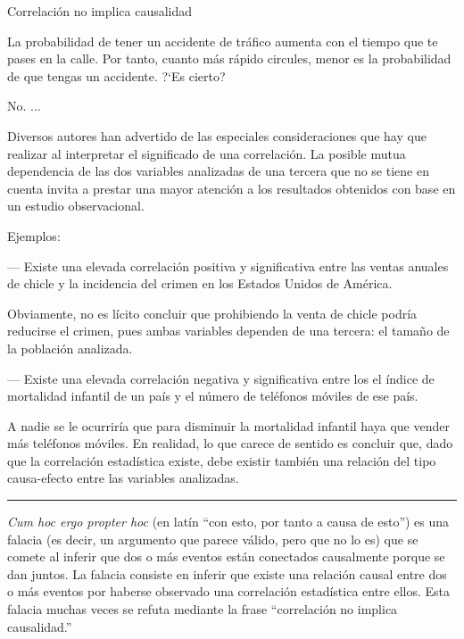 \begin{myexampleblock}{Correlación no implica causalidad}
\begin{small}
\vspace{2mm} La probabilidad de tener un accidente de tráfico aumenta con el tiempo que te pases en la calle. Por tanto, cuanto más rápido circules, menor es la probabilidad de que tengas un accidente. ?`Es cierto? 

\vspace{2mm} \textcolor{gris}{No. ... }

\vspace{2mm} Diversos autores han advertido de las especiales consideraciones que hay que realizar al interpretar el significado de una correlación. La posible mutua dependencia de las dos variables analizadas de una tercera que no se tiene en cuenta invita a prestar una mayor atención a los resultados obtenidos con base en un estudio observacional. 

\vspace{2mm} Ejemplos: 

\vspace{2mm} --- Existe una elevada correlación positiva y significativa entre las ventas anuales de chicle y la incidencia del crimen en los Estados Unidos de América. 

\vspace{2mm} Obviamente, no es lícito concluir que prohibiendo la venta de chicle podría reducirse el crimen, pues ambas variables dependen de una tercera: el tamaño de la población analizada. 

\vspace{2mm} --- Existe una elevada correlación negativa y significativa entre los el índice de mortalidad infantil de un país y el número de teléfonos móviles de ese país. 

\vspace{2mm} A nadie se le ocurriría que para disminuir la mortalidad infantil haya que vender más teléfonos móviles. En realidad, lo que carece de sentido es concluir que, dado que la correlación estadística existe, debe existir también una relación del tipo causa-efecto entre las variables analizadas. 


\rule{100pt}{0.1mm}

\vspace{2mm} 
\begin{adjustwidth}{20pt}{20pt}
	\textsf{\emph{Cum hoc ergo propter hoc} (en latín ``con esto, por tanto a causa de esto'') es una falacia (es decir, un argumento que parece válido, pero que no lo es) que se comete al inferir que dos o más eventos están conectados causalmente porque se dan juntos. La falacia consiste en inferir que existe una relación causal entre dos o más eventos por haberse observado una correlación estadística entre ellos. Esta falacia muchas veces se refuta mediante la frase ``correlación no implica causalidad.''}
\end{adjustwidth}
\end{small}	
\end{myexampleblock}




